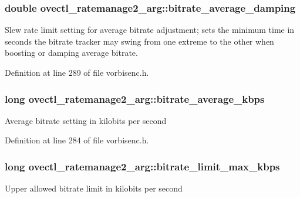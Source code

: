 \subsubsection[{\texorpdfstring{bitrate\+\_\+average\+\_\+damping}{bitrate_average_damping}}]{\setlength{\rightskip}{0pt plus 5cm}double ovectl\+\_\+ratemanage2\+\_\+arg\+::bitrate\+\_\+average\+\_\+damping}\hypertarget{structovectl__ratemanage2__arg_a1069e148a884d8706928cd2e39870720}{}\label{structovectl__ratemanage2__arg_a1069e148a884d8706928cd2e39870720}
Slew rate limit setting for average bitrate adjustment; sets the minimum time in seconds the bitrate tracker may swing from one extreme to the other when boosting or damping average bitrate. 

Definition at line 289 of file vorbisenc.\+h.

\subsubsection[{\texorpdfstring{bitrate\+\_\+average\+\_\+kbps}{bitrate_average_kbps}}]{\setlength{\rightskip}{0pt plus 5cm}long ovectl\+\_\+ratemanage2\+\_\+arg\+::bitrate\+\_\+average\+\_\+kbps}\hypertarget{structovectl__ratemanage2__arg_a1f6bab60d87143d5060dd6c59aad6e71}{}\label{structovectl__ratemanage2__arg_a1f6bab60d87143d5060dd6c59aad6e71}
Average bitrate setting in kilobits per second 

Definition at line 284 of file vorbisenc.\+h.

\subsubsection[{\texorpdfstring{bitrate\+\_\+limit\+\_\+max\+\_\+kbps}{bitrate_limit_max_kbps}}]{\setlength{\rightskip}{0pt plus 5cm}long ovectl\+\_\+ratemanage2\+\_\+arg\+::bitrate\+\_\+limit\+\_\+max\+\_\+kbps}\hypertarget{structovectl__ratemanage2__arg_a175691482003edd7d94592fa2bc993a9}{}\label{structovectl__ratemanage2__arg_a175691482003edd7d94592fa2bc993a9}
Upper allowed bitrate limit in kilobits per second 

